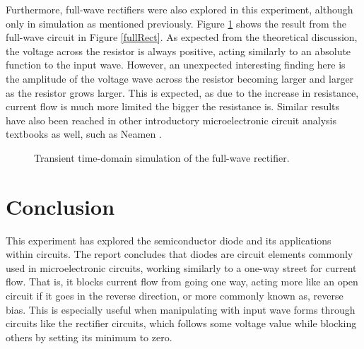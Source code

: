 \documentclass[11pt]{report}
\begin{document}
Furthermore, full-wave rectifiers were also explored in this experiment, although only in simulation as mentioned previously. Figure \ref{fullRectRes} shows the result from the full-wave circuit in Figure \ref{fullRect}. As expected from the theoretical discussion, the voltage across the resistor is always positive, acting similarly to an absolute function to the input wave. However, an unexpected interesting finding here is the amplitude of the voltage wave across the resistor becoming larger and larger as the resistor grows larger. This is expected, as due to the increase in resistance, current flow is much more limited the bigger the resistance is. Similar results have also been reached in other introductory microelectronic circuit analysis textbooks as well, such as Neamen \autocite{neamenMicroelectronicsCircuitAnalysis2007}. 
\begin{figure}[h]
	\centering
	\caption{Transient time-domain simulation of the full-wave rectifier.}
	\label{fullRectRes}
\end{figure}

\section{Conclusion}
This experiment has explored the semiconductor diode and its applications within circuits. The report concludes that diodes are circuit elements commonly used in microelectronic circuits, working similarly to a one-way street for current flow. That is, it blocks current flow from going one way, acting more like an open circuit if it goes in the reverse direction, or more commonly known as, reverse bias. This is especially useful when manipulating with input wave forms through circuits like the rectifier circuits, which follows some voltage value while blocking others by setting its minimum to zero.
\end{document}
